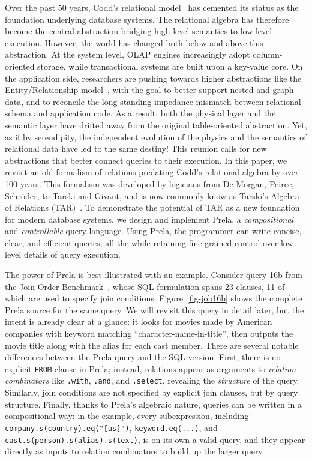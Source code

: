 \documentclass[sigconf,screen,pbalance]{cidr-2027}
\newcommand{\noun}[1]{\textsf{#1}}
\newcommand{\code}{\lstinline[style=prela]}
\newcommand{\sql}{\lstinline[style=sql]}
\begin{document}
Over the past 50 years, Codd's relational model~\cite{DBLP:journals/cacm/Codd70} has cemented its status as the foundation underlying database systems.
The relational algebra has therefore become the central abstraction bridging high-level semantics to low-level execution.
However, the world has changed both below and above this abstraction.
At the system level, OLAP engines increasingly adopt column-oriented storage, while transactional systems are built upon a key-value core.
On the application side, researchers are pushing towards higher abstractions like the Entity/Relationship model~\cite{DBLP:conf/cidr/Deshpande25,DBLP:journals/tods/Chen76}, with the goal to better support nested and graph data, and to reconcile the long-standing impedance mismatch between relational schema and application code.
As a result, both the physical layer and the semantic layer have drifted away from the original table-oriented abstraction.
Yet, as if by serendipity, the independent evolution of the physics and the semantics of relational data have led to the same destiny!
This reunion calls for new abstractions that better connect queries to their execution.
In this paper, we revisit an old formalism of relations predating Codd's relational algebra by over 100 years.
This formalism was developed by logicians from De Morgan, Peirce, Schröder, to Tarski and Givant, and is now commonly know as Tarski's Algebra of Relations (\noun{TAR})~\cite{DBLP:journals/jsyml/Tarski41,tarski1987formalization,Maddux1991-MADTOO}.
To demonstrate the potential of \noun{TAR} as a new foundation for modern database systems, we design and implement Prela, a \emph{compositional} and \emph{controllable} query language.
Using Prela, the programmer can write concise, clear, and efficient queries, all the while retaining fine-grained control over low-level details of query execution.

The power of Prela is best illustrated with an example.
Consider query 16b from the Join Order Benchmark~\cite{DBLP:journals/pvldb/LeisGMBK015}, whose SQL formulation spans 23 clauses, 11 of which are used to specify join conditions.
Figure~\ref{fig-job16b} shows the complete Prela source for the same query.
We will revisit this query in detail later, but the intent is already clear at a glance: it looks for movies made by American companies with keyword matching ``character-name-in-title'', then outputs the movie title along with the alias for each cast member.
There are several notable differences between the Prela query and the SQL version.
First, there is no explicit \sql|FROM| clause in Prela; instead, relations appear as arguments to \emph{relation combinators} like \code|.with|, \code|.and|, and \code|.select|, revealing the \emph{structure} of the query.
Similarly, join conditions are not specified by explicit join clauses, but by query structure.
Finally, thanks to Prela's algebraic nature, queries can be written in a compositional way: in the example, every subexpression, including \code|company.s(country).eq("[us]")|, \code|keyword.eq(...)|, and \code|cast.s(person).s(alias).s(text)|, is on its own a valid query, and they appear directly as inputs to relation combinators to build up the larger query.
\end{document}
